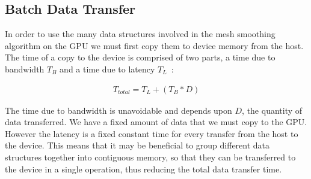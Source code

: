 \subsection{Batch Data Transfer}
In order to use the many data structures involved in the mesh smoothing algorithm on the GPU we must first copy them to device memory from the host. The time of a copy to the device is comprised of two parts, a time due to bandwidth \begin{math}T_B\end{math} and a time due to latency \begin{math}T_L\end{math}~\cite{transfer2}:

\begin{align*}
T_\mathit{total} = T_L + (T_B*D)
\end{align*}

The time due to bandwidth is unavoidable and depends upon \begin{math}D\end{math}, the quantity of data transferred. We have a fixed amount of data that we must copy to the GPU. However the latency is a fixed constant time for every transfer from the host to the device. This means that it may be beneficial to group different data structures together into contiguous memory, so that they can be transferred to the device in a single operation, thus reducing the total data transfer time.